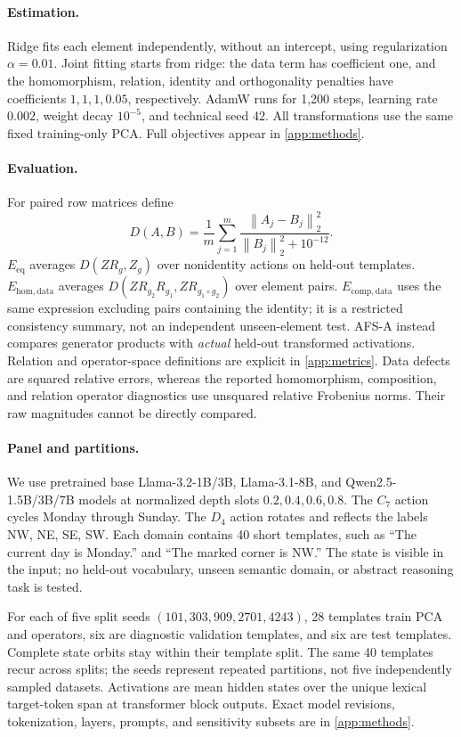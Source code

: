 \documentclass{article}
\newcommand{\norm}[1]{\left\lVert #1\right\rVert}
\newcommand{\Eeq}{E_{\mathrm{eq}}}
\newcommand{\Ehom}{E_{\mathrm{hom,data}}}
\newcommand{\Ecomp}{E_{\mathrm{comp,data}}}
\begin{document}
\paragraph{Estimation.}
Ridge fits each element independently, without an intercept, using regularization $\alpha=0.01$. Joint fitting starts from ridge: the data term has coefficient one, and the homomorphism, relation, identity and orthogonality penalties have coefficients $1,1,1,0.05$, respectively. AdamW runs for 1,200 steps, learning rate $0.002$, weight decay $10^{-5}$, and technical seed 42. All transformations use the same fixed training-only PCA. Full objectives appear in \cref{app:methods}.

\paragraph{Evaluation.}
For paired row matrices define
\begin{equation}
 D(A,B)=\frac{1}{m}\sum_{j=1}^m
 \frac{\norm{A_j-B_j}_2^2}{\norm{B_j}_2^2+10^{-12}}.
 \label{eq:D}
\end{equation}
$\Eeq$ averages $D(ZR_g,Z_g)$ over nonidentity actions on held-out templates. $\Ehom$ averages $D(ZR_{g_2}R_{g_1},ZR_{g_1\circ g_2})$ over element pairs. $\Ecomp$ uses the same expression excluding pairs containing the identity; it is a restricted consistency summary, not an independent unseen-element test. AFS-A instead compares generator products with \emph{actual} held-out transformed activations. Relation and operator-space definitions are explicit in \cref{app:metrics}. Data defects are squared relative errors, whereas the reported homomorphism, composition, and relation operator diagnostics use unsquared relative Frobenius norms. Their raw magnitudes cannot be directly compared.

\paragraph{Panel and partitions.}
\label{sec:design}
We use pretrained base Llama-3.2-1B/3B, Llama-3.1-8B, and Qwen2.5-1.5B/3B/7B models at normalized depth slots $0.2,0.4,0.6,0.8$. The $C_7$ action cycles Monday through Sunday. The $D_4$ action rotates and reflects the labels NW, NE, SE, SW. Each domain contains 40 short templates, such as ``The current day is Monday.'' and ``The marked corner is NW.'' The state is visible in the input; no held-out vocabulary, unseen semantic domain, or abstract reasoning task is tested.

For each of five split seeds $(101,303,909,2701,4243)$, 28 templates train PCA and operators, six are diagnostic validation templates, and six are test templates. Complete state orbits stay within their template split. The same 40 templates recur across splits; the seeds represent repeated partitions, not five independently sampled datasets. Activations are mean hidden states over the unique lexical target-token span at transformer block outputs. Exact model revisions, tokenization, layers, prompts, and sensitivity subsets are in \cref{app:methods}.
\end{document}
